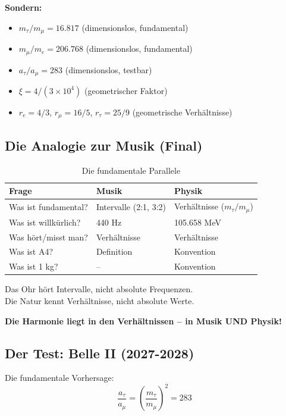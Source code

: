 \textbf{Sondern:}
\begin{itemize}[nosep]
	\item $m_\tau / m_\mu = 16.817$ (dimensionslos, fundamental)
	\item $m_\mu / m_e = 206.768$ (dimensionslos, fundamental)
	\item $a_\tau / a_\mu = 283$ (dimensionslos, testbar)
	\item $\xi = 4/(3 \times 10^4)$ (geometrischer Faktor)
	\item $r_e = 4/3$, $r_\mu = 16/5$, $r_\tau = 25/9$ (geometrische Verhältnisse)
\end{itemize}

\subsection{Die Analogie zur Musik (Final)}

\begin{table}[h]
	\centering
	\begin{tabular}{p{}p{}p{}}
		\toprule
		\textbf{Frage} & \textbf{Musik} & \textbf{Physik} \\
		\midrule
		Was ist fundamental? & Intervalle (2:1, 3:2) & Verhältnisse ($m_\tau/m_\mu$) \\
		Was ist willkürlich? & 440 Hz & 105.658 MeV \\
		Was hört/misst man? & Verhältnisse & Verhältnisse \\
		Was ist A4? & Definition & Konvention \\
		Was ist 1 kg? & -- & Konvention \\
		\bottomrule
	\end{tabular}
	\caption{Die fundamentale Parallele}
\end{table}

\begin{keypoint}
	Das Ohr hört Intervalle, nicht absolute Frequenzen. \\
	Die Natur kennt Verhältnisse, nicht absolute Werte.
	
	\textbf{Die Harmonie liegt in den Verhältnissen -- in Musik UND Physik!}
\end{keypoint}

\subsection{Der Test: Belle II (2027-2028)}

Die fundamentale Vorhersage:
\begin{equation}
	\boxed{\frac{a_\tau}{a_\mu} = \left(\frac{m_\tau}{m_\mu}\right)^2 = 283}
\end{equation}


